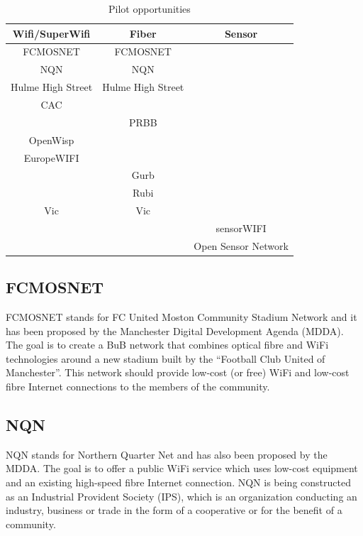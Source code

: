 \documentclass[conference]{IEEEtran}
\begin{document}
\begin{table}[!t]
\renewcommand{\arraystretch}{1.3}
\caption{Pilot opportunities}
\label{tab:pilot_opportunities}
\centering
\begin{tabular}{|c||c||c|}
\hline
Wifi/SuperWifi & Fiber & Sensor\\
\hline
FCMOSNET & FCMOSNET & \\
NQN & NQN & \\
Hulme High Street & Hulme High Street & \\
CAC & & \\
& PRBB & \\
OpenWisp& & \\
EuropeWIFI& & \\
& Gurb & \\
& Rubi & \\
Vic & Vic & \\
& & sensorWIFI\\
& & Open Sensor Network\\
\hline
\end{tabular}
\end{table}


\subsection{FCMOSNET}
FCMOSNET stands for FC United Moston Community Stadium Network and it has been proposed by the Manchester Digital Development Agenda (MDDA).
The goal is to create a BuB network that combines optical fibre and WiFi technologies around a new stadium built by the ``Football Club United of Manchester''.
This network should provide low-cost (or free) WiFi and low-cost fibre Internet connections to the members of the community.

\subsection{NQN}
NQN stands for Northern Quarter Net and has also been proposed by the MDDA.
The goal is to offer a public WiFi service which uses low-cost equipment and an existing high-speed fibre Internet connection.
NQN is being constructed as an Industrial Provident Society (IPS), which is an organization conducting an industry, business or trade in the form of a cooperative or for the benefit of a community.
\end{document}
